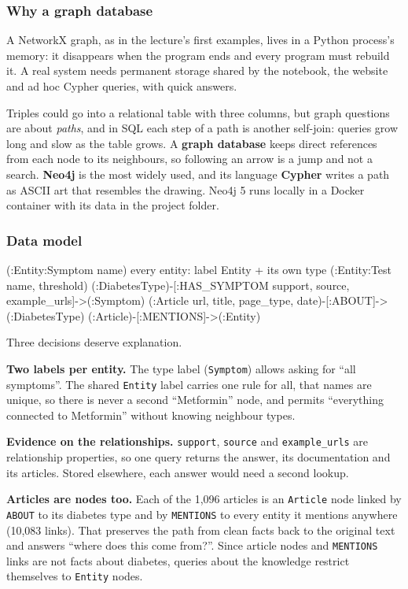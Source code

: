 \documentclass[11pt, a4paper]{article}
\newcommand{\code}[1]{\texttt{#1}}
\begin{document}
\subsubsection{Why a graph database}

A NetworkX graph, as in the lecture's first examples, lives in a Python process's memory: it disappears when the program ends and every program must rebuild it. A real system needs permanent storage shared by the notebook, the website and ad hoc Cypher queries, with quick answers.

Triples could go into a relational table with three columns, but graph questions are about \emph{paths}, and in SQL each step of a path is another self-join: queries grow long and slow as the table grows. A \textbf{graph database} keeps direct references from each node to its neighbours, so following an arrow is a jump and not a search. \textbf{Neo4j} is the most widely used, and its language \textbf{Cypher} writes a path as ASCII art that resembles the drawing. Neo4j 5 runs locally in a Docker container with its data in the project folder.

\subsubsection{Data model}

\begin{codeblock}
(:Entity:Symptom {name})                       every entity: label Entity + its own type
(:Entity:Test {name, threshold})
(:DiabetesType)-[:HAS_SYMPTOM {support, source, example_urls}]->(:Symptom)
(:Article {url, title, page_type, date})-[:ABOUT]->(:DiabetesType)
(:Article)-[:MENTIONS]->(:Entity)
\end{codeblock}

Three decisions deserve explanation.

\textbf{Two labels per entity.} The type label (\code{Symptom}) allows asking for ``all symptoms''. The shared \code{Entity} label carries one rule for all, that names are unique, so there is never a second ``Metformin'' node, and permits ``everything connected to Metformin'' without knowing neighbour types.

\textbf{Evidence on the relationships.} \code{support}, \code{source} and \code{example\_urls} are relationship properties, so one query returns the answer, its documentation and its articles. Stored elsewhere, each answer would need a second lookup.

\textbf{Articles are nodes too.} Each of the 1,096 articles is an \code{Article} node linked by \code{ABOUT} to its diabetes type and by \code{MENTIONS} to every entity it mentions anywhere (10,083 links). That preserves the path from clean facts back to the original text and answers ``where does this come from?''. Since article nodes and \code{MENTIONS} links are not facts about diabetes, queries about the knowledge restrict themselves to \code{Entity} nodes.
\end{document}
